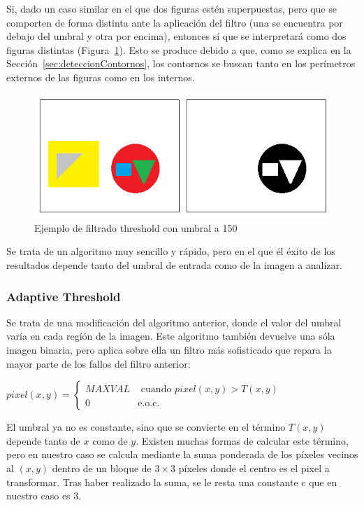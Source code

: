 {	Si, dado un caso similar en el que dos figuras estén superpuestas, pero que se comporten de forma distinta ante la aplicación del filtro (una se encuentra por debajo del umbral y otra por encima), entonces sí que se interpretará como dos figuras distintas (Figura~\ref{fig:threshold2}). Esto se produce debido a que, como se explica en la Sección~\ref{sec:deteccionContornos}, los contornos se buscan tanto en los perímetros externos de las figuras como en los internos.
	
		\begin{figure}[htbp]
		\centering
		\includegraphics[scale=0.47]{graphics/threshold2.png}
		\caption{Ejemplo de filtrado threshold con umbral a 150}
		\label{fig:threshold2}
		\end{figure}
		
	Se trata de un algoritmo muy sencillo y rápido, pero en el que él éxito de los resultados depende tanto del umbral de entrada como de la imagen a analizar.
		
	\subsubsection{Adaptive Threshold}
	
	Se trata de una modificación del algoritmo anterior, donde el valor del umbral varía en cada regíón de la imagen. Este algoritmo también devuelve una sóla imagen binaria, pero aplica sobre ella un filtro más sofisticado que repara la mayor parte de los fallos del filtro anterior:

	\begin{center}
		$pixel(x,y) = \left\{
		\begin{array}{cc}
		MAXVAL 	& \text{ cuando } pixel(x,y) > T(x,y)\\ 
		0 	    & 	\text{e.o.c.}
		\end{array}\right.$
	\end{center}
	
	El umbral ya no es constante, sino que se convierte en el término $T(x,y)$ depende tanto de $x$ como de $y$. Existen muchas formas de calcular este término, pero en nuestro caso se calcula mediante la suma ponderada de los píxeles vecinos al $(x,y)$ dentro de un bloque de $3\times3$ píxeles donde el centro es el pixel a transformar. Tras haber realizado la suma, se le resta una constante c que en nuestro caso es 3.\\
	
}
